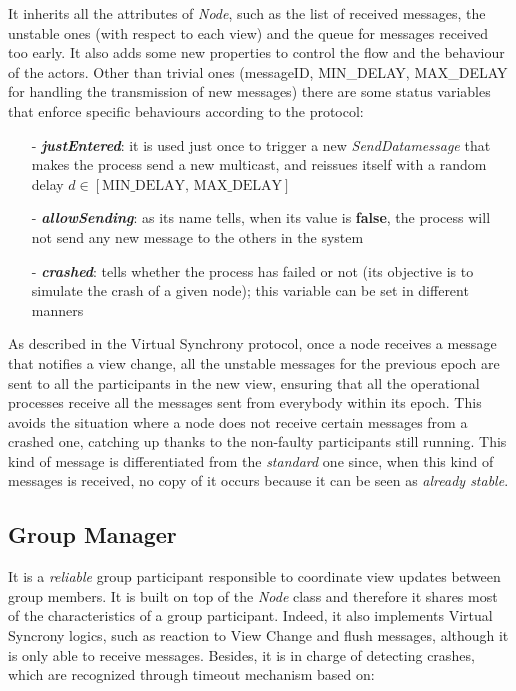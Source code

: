 \documentclass[11pt]{article}
\begin{document}
	It inherits all the attributes of \textit{Node}, such as the list of received messages, the unstable ones (with respect to each view) and the queue for messages received too early. It also adds some new properties to control the flow and the behaviour of the actors. Other than trivial ones (messageID, MIN\_DELAY, MAX\_DELAY for handling the transmission of new messages) there are some status variables that enforce specific behaviours according to the protocol:
	\begin{itemize}
		\item [-] \textit{\textbf{justEntered}}: it is used just once to trigger a new \textit{SendDatamessage} that makes the process send a new multicast, and reissues itself with a random delay $d \in [\text{MIN\_DELAY, MAX\_DELAY}]$
		\item [-] \textit{\textbf{allowSending}}: as its name tells, when its value is \textbf{false}, the process will not send any new message to the others in the system
		\item [-] \textit{\textbf{crashed}}: tells whether the process has failed or not (its objective is to simulate the crash of a given node); this variable can be set in different manners 
	\end{itemize}
	As described in the Virtual Synchrony protocol, once a node receives a message that notifies a view change, all the unstable messages for the previous epoch are sent to all the participants in the new view, ensuring that all the operational processes receive all the messages sent from everybody within its epoch. This avoids the situation where a node does not receive certain messages from a crashed one, catching up thanks to the non-faulty participants still running.
	This kind of message is differentiated from the \textit{standard} one since, when this kind of messages is received, no copy of it occurs because it can be seen as \textit{already stable}.
	
	\subsection{Group Manager}
	It is a \textit{reliable} group participant responsible to coordinate view updates between group members. It is built on top of the \textit{Node} class and therefore it shares most of the characteristics of a group participant. Indeed, it also implements Virtual Syncrony logics, such as reaction to View Change and flush messages, although it is only able to receive messages. Besides, it is in charge of detecting crashes, which are recognized through timeout mechanism based on:
	
\end{document}
